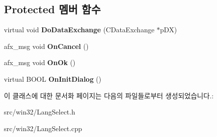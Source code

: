 \subsection*{Protected 멤버 함수}
\begin{DoxyCompactItemize}
\item 
\mbox{\label{class_lang_select_aed6d5a0a1a5ffc02ac08f06cade9169a}} 
virtual void {\bfseries Do\+Data\+Exchange} (C\+Data\+Exchange $\ast$p\+DX)
\item 
\mbox{\label{class_lang_select_af77cabdf85041273c5b6da89cb92508c}} 
afx\+\_\+msg void {\bfseries On\+Cancel} ()
\item 
\mbox{\label{class_lang_select_ad10c9461cc371d496c41ede46c64c35e}} 
afx\+\_\+msg void {\bfseries On\+Ok} ()
\item 
\mbox{\label{class_lang_select_ab98f0d9a2302d971a9430c921fc52f8b}} 
virtual B\+O\+OL {\bfseries On\+Init\+Dialog} ()
\end{DoxyCompactItemize}


이 클래스에 대한 문서화 페이지는 다음의 파일들로부터 생성되었습니다.\+:\begin{DoxyCompactItemize}
\item 
src/win32/Lang\+Select.\+h\item 
src/win32/Lang\+Select.\+cpp\end{DoxyCompactItemize}
